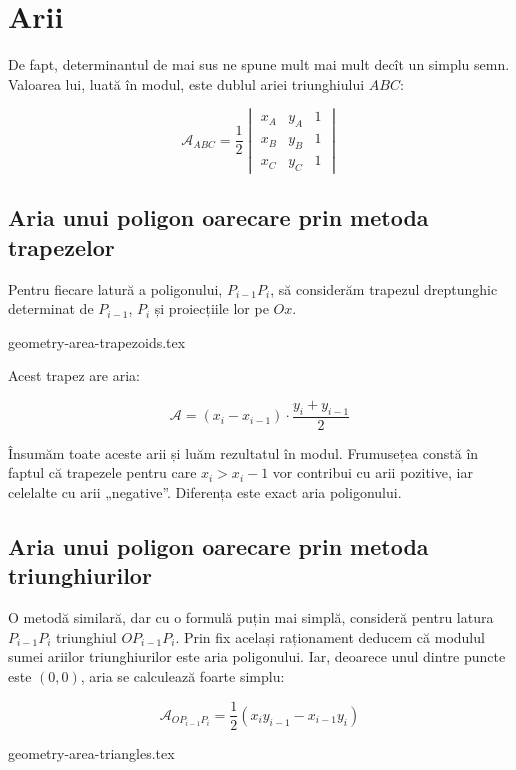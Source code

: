 \documentclass[../main.tex]{subfiles}
\begin{document}
\section{Arii}
\label{sec-arii}

De fapt, determinantul de mai sus ne spune mult mai mult decît un simplu semn. Valoarea lui, luată în modul, este dublul ariei triunghiului $ABC$:

$$
\mathcal{A}_{ABC} = \frac{1}{2}
\begin{vmatrix}
x_A & y_A & 1\\
x_B & y_B & 1 \\
x_C & y_C & 1
\end{vmatrix}
$$

\subsection{Aria unui poligon oarecare prin metoda trapezelor}

Pentru fiecare latură a poligonului, $P_{i-1}P_{i}$, să considerăm trapezul dreptunghic determinat de $P_{i-1}$, $P_i$ și proiecțiile lor pe $Ox$.

{geometry-area-trapezoids.tex}

Acest trapez are aria:

$$\mathcal{A} = (x_i - x_{i-1}) \cdot \frac{y_i + y_{i-1}}{2}$$

Însumăm toate aceste arii și luăm rezultatul în modul. Frumusețea constă în faptul că trapezele pentru care $x_i > x_i - 1$ vor contribui cu arii pozitive, iar celelalte cu arii „negative”. Diferența este exact aria poligonului.

\subsection{Aria unui poligon oarecare prin metoda triunghiurilor}

O metodă similară, dar cu o formulă puțin mai simplă, consideră pentru latura $P_{i-1}P_{i}$ triunghiul $OP_{i-1}P_{i}$. Prin fix același raționament deducem că modulul sumei ariilor triunghiurilor este aria poligonului. Iar, deoarece unul dintre puncte este $(0,0)$, aria se calculează foarte simplu:

$$\mathcal{A}_{OP_{i-1}P_{i}} = \frac{1}{2}(x_iy_{i-1} - x_{i-1}y_{i})$$

{geometry-area-triangles.tex}
\end{document}
